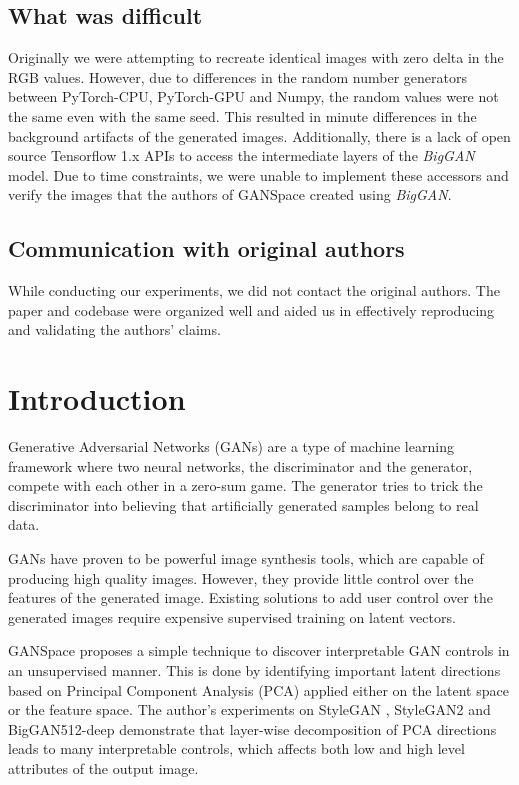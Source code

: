 \subsection*{What was difficult}

Originally we were attempting to recreate identical images with zero delta in the RGB values. However, due to differences in the random number generators between PyTorch-CPU, PyTorch-GPU and Numpy, the random values were not the same even with the same seed. This resulted in minute differences in the background artifacts of the generated images. Additionally, there is a lack of open source Tensorflow 1.x APIs to access the intermediate layers of the \textit{BigGAN} model. Due to time constraints, we were unable to implement these accessors and verify the images that the authors of GANSpace created using \textit{BigGAN}.

\subsection*{Communication with original authors}

While conducting our experiments, we did not contact the original authors. The paper and codebase were organized well and aided us in effectively reproducing and validating the authors' claims.

\newpage

\section{Introduction}

Generative Adversarial Networks (GANs) \cite{gan} are a type of machine learning framework where two neural networks, the discriminator and the generator, compete with each other in a zero-sum game. The generator tries to trick the discriminator into believing that artificially generated samples belong to real data.

GANs have proven to be powerful image synthesis tools, which are capable of producing high quality images. However, they provide little control over the features of the generated image. Existing solutions to add user control over the generated images require expensive supervised training on latent vectors.

GANSpace \cite{GANSpace} proposes a simple technique to discover interpretable GAN controls in an unsupervised manner. This is done by identifying important latent directions based on Principal Component Analysis (PCA) applied either on the latent space or the feature space. The author's experiments on StyleGAN \cite{stylegan}, StyleGAN2 \cite{stylegan2} and BigGAN512-deep \cite{biggan} demonstrate that layer-wise decomposition of PCA directions leads to many interpretable controls, which affects both low and high level attributes of the output image.


